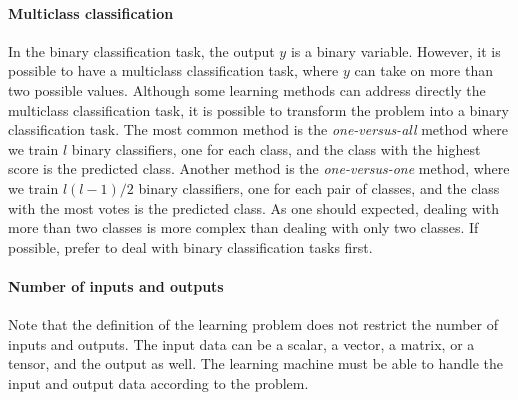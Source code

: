 \paragraph{Multiclass classification}
In the binary classification task, the output $y$ is
a binary variable.  However, it is possible to have a multiclass classification task,
where  $y$ can take on more than two possible values.  Although some learning methods can
address directly the multiclass classification task, it is possible to transform the
problem into a binary classification task.  The most common method is the
\emph{one-versus-all} method where we train $l$ binary classifiers, one for each class,
and the class with the highest score is the predicted class.  Another method is the
\emph{one-versus-one} method, where we train $l(l-1)/2$ binary classifiers, one for each
pair of classes, and the class with the most votes is the predicted class.
As one should expected, dealing with more than two classes is more complex than dealing
with only two classes.  If possible, prefer to deal with binary classification tasks first.

\paragraph{Number of inputs and outputs}
Note that the definition of the learning problem does not restrict the number of inputs
and outputs.  The input data can be a scalar, a vector, a matrix, or a tensor, and the
output as well.  The learning machine must be able to handle the input and output data
according to the problem.



